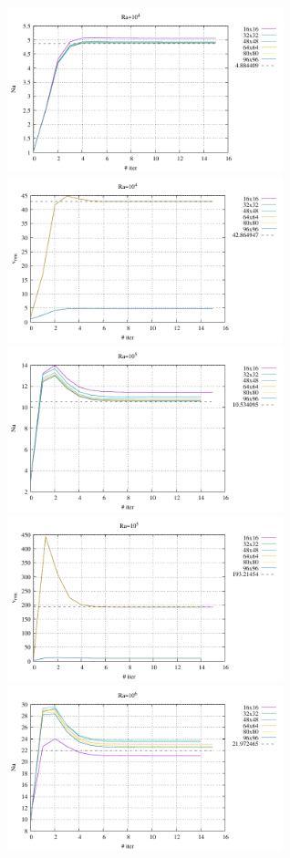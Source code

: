 \begin{center}
\includegraphics[width=8cm]{python_codes/md/results_ss/Nu_Ra1e4.pdf}
\includegraphics[width=8cm]{python_codes/md/results_ss/vrms_Ra1e4.pdf}\\
\includegraphics[width=8cm]{python_codes/md/results_ss/Nu_Ra1e5.pdf}
\includegraphics[width=8cm]{python_codes/md/results_ss/vrms_Ra1e5.pdf}\\
\includegraphics[width=8cm]{python_codes/md/results_ss/Nu_Ra1e6.pdf}

\end{center}
